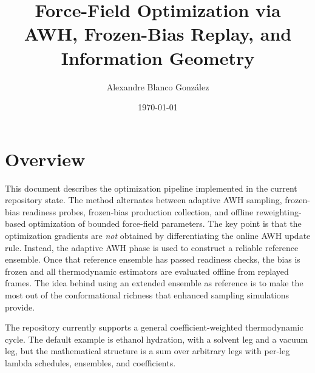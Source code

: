 \documentclass[12pt]{article}
\title{Force-Field Optimization via AWH, Frozen-Bias Replay, and Information Geometry}
\author{Alexandre Blanco Gonz\'alez}
\date{\today}
\begin{document}
\maketitle
\tableofcontents

\section{Overview}

This document describes the optimization pipeline implemented in the current repository state. The method alternates between adaptive AWH sampling, frozen-bias readiness probes, frozen-bias production collection, and offline reweighting-based optimization of bounded force-field parameters. The key point is that the optimization gradients are \emph{not} obtained by differentiating the online AWH update rule. Instead, the adaptive AWH phase is used to construct a reliable reference ensemble. Once that reference ensemble has passed readiness checks, the bias is frozen and all thermodynamic estimators are evaluated offline from replayed frames. The idea behind using an extended ensemble as reference is to make the most out of the conformational richness that enhanced sampling simulations provide.

The repository currently supports a general coefficient-weighted thermodynamic cycle. The default example is ethanol hydration, with a solvent leg and a vacuum leg, but the mathematical structure is a sum over arbitrary legs with per-leg lambda schedules, ensembles, and coefficients.



\end{document}
